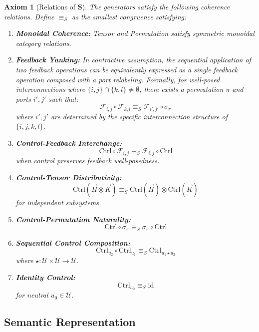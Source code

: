 \documentclass[11pt]{article}
\newtheorem{axiom}{Axiom}
\begin{document}
\begin{axiom}[Relations of $\mathbf{S}$]\label{ax:S3}
The generators satisfy the following coherence relations. Define $\equiv_S$ as the smallest congruence satisfying:

\begin{enumerate}[label=(\roman*)]
    \item \textbf{Monoidal Coherence:} Tensor and Permutation satisfy symmetric monoidal category relations.

	\item \textbf{Feedback Yanking:} In contractive assumption, the sequential application of two feedback operations can be equivalently expressed as a single feedback operation composed with a port relabeling. Formally, for well-posed interconnections where $\{i,j\} \cap \{k,l\} \neq \emptyset$, there exists a permutation $\pi$ and ports $i', j'$ such that:
	\[
	\mathcal{F}_{i,j} \circ \mathcal{F}_{k,l} \equiv_S \mathcal{F}_{i',j'} \circ \sigma_{\pi}
	\]
	where $i', j'$ are determined by the specific interconnection structure of $\{i,j,k,l\}$.

    \item \textbf{Control-Feedback Interchange:}
    \[
    \mathrm{Ctrl} \circ \mathcal{F}_{i,j} \equiv_S \mathcal{F}_{i,j} \circ \mathrm{Ctrl}
    \]
    when control preserves feedback well-posedness.

    \item \textbf{Control-Tensor Distributivity:}
    \[
    \mathrm{Ctrl}(\vec{H} \otimes \vec{K}) \equiv_S \mathrm{Ctrl}(\vec{H}) \otimes \mathrm{Ctrl}(\vec{K})
    \]
    for independent subsystems.

    \item \textbf{Control-Permutation Naturality:}
    \[
    \mathrm{Ctrl} \circ \sigma_{\pi} \equiv_S \sigma_{\pi} \circ \mathrm{Ctrl}
    \]

    \item \textbf{Sequential Control Composition:}
    \[
    \mathrm{Ctrl}_{u_2} \circ \mathrm{Ctrl}_{u_1} \equiv_S \mathrm{Ctrl}_{u_1 \star u_2}
    \]
    where $\star: \mathcal{U} \times \mathcal{U} \to \mathcal{U}$.

    \item \textbf{Identity Control:}
    \[
    \mathrm{Ctrl}_{u_0} \equiv_S \mathrm{id}
    \]
    for neutral $u_0 \in \mathcal{U}$.
\end{enumerate}
\end{axiom}

\subsection*{Semantic Representation}
\end{document}
